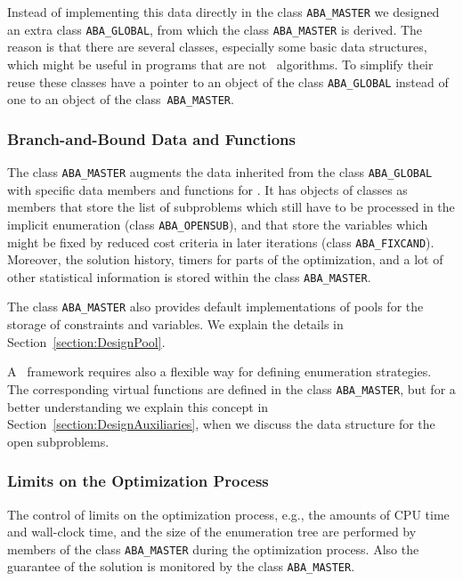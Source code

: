 Instead of implementing this data directly in the class {\tt ABA\_MASTER}
we designed an extra class {\tt ABA\_GLO\-BAL}, 
from which the class {\tt ABA\_MASTER}
is derived. The reason is that there are several classes, especially some 
basic data structures, which might be useful in programs that
are not \bab\ algorithms. To simplify their reuse these classes
have a pointer to an object of the class {\tt ABA\_GLOBAL} instead of one to an
object of the class~{\tt ABA\_MASTER}.

\subsubsection{Branch-and-Bound Data and Functions}

The class {\tt ABA\_MASTER}
augments the data inherited from the class
{\tt ABA\_GLOBAL} with specific data members and functions for \bab.
It has objects of classes as members that store the list of subproblems which
still have to be processed in the implicit enumeration 
(class {\tt ABA\_OPENSUB}), 
and that store
the variables which might be fixed by reduced cost criteria in later
iterations (class {\tt ABA\_FIXCAND}). 
Moreover, the solution history, timers for
parts of the optimization, and a lot of other
statistical information is stored within the class {\tt ABA\_MASTER}.

The class {\tt ABA\_MASTER} also provides default implementations of pools for
the storage of constraints and variables. We explain the details in
Section~\ref{section:DesignPool}.

A \bab\ framework requires also a flexible way for defining enumeration
strategies. The corresponding virtual functions are defined in the
class {\tt ABA\_MASTER}, but for a better understanding we explain this concept
in Section~\ref{section:DesignAuxiliaries}, 
when we discuss the data structure for the open subproblems.

\subsubsection{Limits on the Optimization Process}

The control of limits on the optimization process, e.g., the amounts
of CPU time and wall-clock time, and the size of the enumeration tree
are performed by members of the class {\tt ABA\_MASTER} during
the optimization process.
Also the guarantee of the solution is monitored by the class {\tt ABA\_MASTER}.

